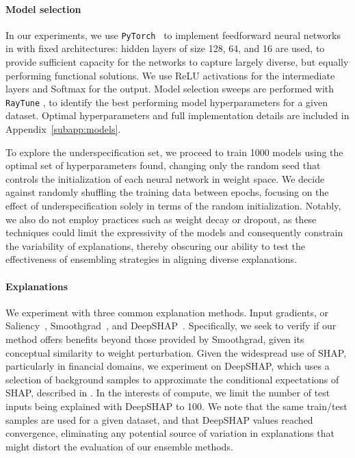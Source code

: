 \paragraph{Model selection} In our experiments, we use \verb+PyTorch+~\citep{paszke2019} to implement feedforward neural networks in  with fixed architectures: hidden layers of size 128, 64, and 16 are used, to provide sufficient capacity for the networks to capture largely diverse, but equally performing functional solutions. We use ReLU activations for the intermediate layers and Softmax for the output. Model selection sweeps are performed with \verb+RayTune+ \citep{liaw2018}, to identify the best performing model hyperparameters for a given dataset. Optimal hyperparameters and full implementation details are included in Appendix~\ref{subapp:models}.

To explore the underspecification set, we proceed to train 1000 models using the optimal set of hyperparameters found, changing only the random seed that controls the initialization of each neural network in weight space. We decide against randomly shuffling the training data between epochs, focusing on the effect of underspecification solely in terms of the random initialization. Notably, we also do not employ practices such as weight decay or dropout, as these techniques could limit the expressivity of the models and consequently constrain the variability of explanations, thereby obscuring our ability to test the effectiveness of ensembling strategies in aligning diverse explanations.


\paragraph{Explanations} We experiment with three common explanation methods. Input gradients, or Saliency~\citep{simonyan2013}, Smoothgrad~\citep{smoothgrad2017}, and DeepSHAP~\citep{lundberg2017}. Specifically, we seek to verify if our method offers benefits beyond those provided by Smoothgrad, given its conceptual similarity to weight perturbation. Given the widespread use of SHAP, particularly in financial domains, we experiment on DeepSHAP, %
which uses a selection of background samples to approximate the conditional expectations of SHAP, described in \citet{lundberg2017}. In the interests of compute, we limit the number of test inputs being explained with DeepSHAP to 100. We note that the same train/test samples are used for a given dataset, and that DeepSHAP values reached convergence, eliminating any potential source of variation in explanations that might distort the evaluation of our ensemble methods.

